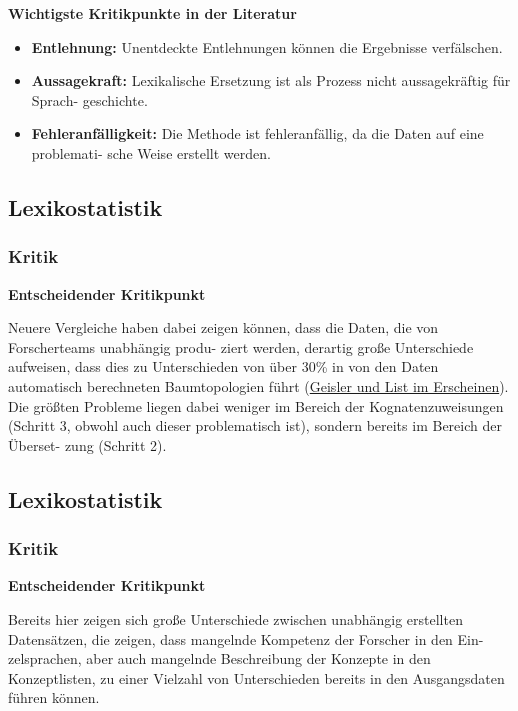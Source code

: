 \textbf{Wichtigste Kritikpunkte in der Literatur}

\begin{itemize}
\itemsep1pt\parskip0pt
\item
  \textbf{Entlehnung:} Unentdeckte Entlehnungen können die Ergebnisse
  verfälschen.
\item
  \textbf{Aussagekraft:} Lexikalische Ersetzung ist als Prozess nicht
  aussagekräftig für Sprach- geschichte.
\item
  \textbf{Fehleranfälligkeit:} Die Methode ist fehleranfällig, da die
  Daten auf eine problemati- sche Weise erstellt werden.
\end{itemize}

\subsection{\texorpdfstring{{Lexikostatistik}}{Lexikostatistik}}

\subsubsection{\texorpdfstring{{Kritik}}{Kritik}}

\textbf{Entscheidender Kritikpunkt}

Neuere Vergleiche haben dabei zeigen können, dass die Daten, die von
Forscherteams unabhängig produ- ziert werden, derartig große
Unterschiede aufweisen, dass dies zu Unterschieden von über 30\% in von
den Daten automatisch berechneten Baumtopologien führt
(\href{http://lingulist.de/jump.php?paper=Geisler2014\&href=documents/beautiful_trees.pdf}{Geisler
und List im Erscheinen}). Die größten Probleme liegen dabei weniger im
Bereich der Kognatenzuweisungen (Schritt 3, obwohl auch dieser
problematisch ist), sondern bereits im Bereich der Überset- zung
(Schritt 2).

\subsection{\texorpdfstring{{Lexikostatistik}}{Lexikostatistik}}

\subsubsection{\texorpdfstring{{Kritik}}{Kritik}}

\textbf{Entscheidender Kritikpunkt}

Bereits hier zeigen sich große Unterschiede zwischen unabhängig
erstellten Datensätzen, die zeigen, dass mangelnde Kompetenz der
Forscher in den Ein- zelsprachen, aber auch mangelnde Beschreibung der
Konzepte in den Konzeptlisten, zu einer Vielzahl von Unterschieden
bereits in den Ausgangsdaten führen können.

